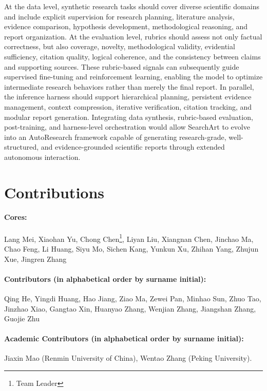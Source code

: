 \documentclass{huawei}
\begin{document}
At the data level, synthetic research tasks should cover diverse scientific domains and include explicit supervision for research planning, literature analysis, evidence comparison, hypothesis development, methodological reasoning, and report organization. At the evaluation level, rubrics should assess not only factual correctness, but also coverage, novelty, methodological validity, evidential sufficiency, citation quality, logical coherence, and the consistency between claims and supporting sources. These rubric-based signals can subsequently guide supervised fine-tuning and reinforcement learning, enabling the model to optimize intermediate research behaviors rather than merely the final report. In parallel, the inference harness should support hierarchical planning, persistent evidence management, context compression, iterative verification, citation tracking, and modular report generation. Integrating data synthesis, rubric-based evaluation, post-training, and harness-level orchestration would allow SearchArt to evolve into an AutoResearch framework capable of generating research-grade, well-structured, and evidence-grounded scientific reports through extended autonomous interaction.





\begingroup
\renewcommand{\thefootnote}{\fnsymbol{footnote}}
\setcounter{footnote}{0}

\section{Contributions}
\paragraph{Cores:} Lang Mei, Xiaohan Yu, Chong Chen\footnote{Team Leader}, Liyan Liu, Xiangnan Chen, Jinchao Ma, Chao Feng, Li Huang, Siyu Mo, Sichen Kang, Yunkun Xu, Zhihan Yang, Zhujun Xue, Jingren Zhang

\paragraph{Contributors (in alphabetical order by surname initial):} Qing He, Yingdi Huang, Hao Jiang, Ziao Ma, Zewei Pan, Minhao Sun, Zhuo Tao, Jinzhao Xiao, Gangtao Xin, Huanyao Zhang, Wenjian Zhang, Jiangshan Zhang, Guojie Zhu


\paragraph{Academic Contributors (in alphabetical order by surname initial):} Jiaxin Mao (Renmin University of China), Wentao Zhang (Peking University). 
\end{document}
